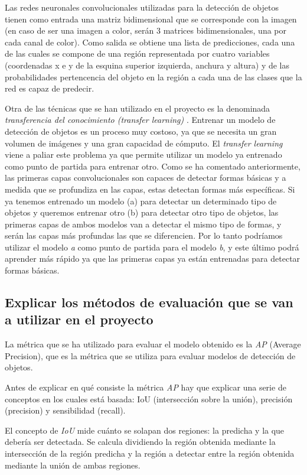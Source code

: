 Las redes neuronales convolucionales utilizadas para la detección de objetos tienen como entrada una matriz bidimensional que se corresponde con la imagen (en caso de ser una imagen a color, serán 3 matrices bidimensionales, una por cada canal de color). Como salida se obtiene una lista de predicciones, cada una de las cuales se compone de una región representada por cuatro variables (coordenadas x e y de la esquina superior izquierda, anchura y altura) y de las probabilidades pertencencia del objeto en la región a cada una de las clases que la red es capaz de predecir.

Otra de las técnicas que se han utilizado en el proyecto es la denominada \textit{transferencia del conocimiento (transfer learning)} \cite{s5_transfer_learning}. Entrenar un modelo de detección de objetos es un proceso muy costoso, ya que se necesita un gran volumen de imágenes y una gran capacidad de cómputo. El \textit{transfer learning} viene a paliar este problema ya que permite utilizar un modelo ya entrenado como punto de partida para entrenar otro. Como se ha comentado anteriormente, las primeras capas convolucionales son capaces de detectar formas básicas y a medida que se profundiza en las capas, estas detectan formas más específicas. Si ya tenemos entrenado un modelo (a) para detectar un determinado tipo de objetos y queremos entrenar otro (b) para detectar otro tipo de objetos, las primeras capas de ambos modelos van a detectar el mismo tipo de formas, y serán las capas más profundas las que se diferencien. Por lo tanto podríamos utilizar el modelo \textit{a} como punto de partida para el modelo \textit{b}, y este último podrá aprender más rápido ya que las primeras capas ya están entrenadas para detectar formas básicas.

\subsection{Explicar los métodos de evaluación que se van a utilizar en el proyecto}

La métrica que se ha utilizado para evaluar el modelo obtenido es la \textit{AP} (Average Precision), que es la métrica que se utiliza para evaluar modelos de detección de objetos.

Antes de explicar en qué consiste la métrica \textit{AP} hay que explicar una serie de conceptos en los cuales está basada: IoU (intersección sobre la unión), precisión (precision) y sensibilidad (recall).

El concepto de \textit{IoU} mide cuánto se solapan dos regiones: la predicha y la que debería ser detectada. Se calcula dividiendo la región obtenida mediante la intersección de la región predicha y la región a detectar entre la región obtenida mediante la unión de ambas regiones.

